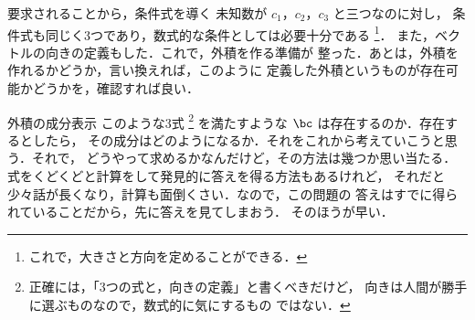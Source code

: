 \begin{mysmallsec}{要求されることから，条件式を導く}
                未知数が $c_{1}$，$c_{2}$，$c_{3}$ と三つなのに対し，
                条件式も同じく3つであり，数式的な条件としては必要十分である
                    \footnote{
                        これで，大きさと方向を定めることができる．
                    }．
                また，ベクトルの向きの定義もした．これで，外積を作る準備が
                整った．あとは，外積を作れるかどうか，言い換えれば，このように
                定義した外積というものが存在可能かどうかを，確認すれば良い．
            \end{mysmallsec}

            \begin{mysmallsec}{外積の成分表示}
                このような3式
                    \footnote{
                        正確には，「3つの式と，向きの定義」と書くべきだけど，
                        向きは人間が勝手に選ぶものなので，数式的に気にするもの
                        ではない．
                    }
                を満たすような $\bc$ は存在するのか．存在するとしたら，
                その成分はどのようになるか．それをこれから考えていこうと思う．それで，
                どうやって求めるかなんだけど，その方法は幾つか思い当たる．
                式をくどくどと計算をして発見的に答えを得る方法もあるけれど，
                それだと少々話が長くなり，計算も面倒くさい．なので，この問題の
                答えはすでに得られていることだから，先に答えを見てしまおう．
                そのほうが早い．


\end{mysmallsec}

